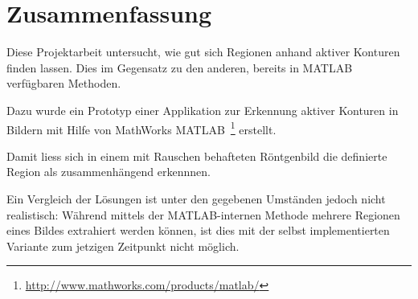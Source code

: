 \chapter{Zusammenfassung}
\label{chap:summary}

Diese Projektarbeit untersucht, wie gut sich Regionen anhand aktiver Konturen finden lassen. Dies im Gegensatz zu den anderen, bereits in MATLAB verfügbaren Methoden.

Dazu wurde ein Prototyp einer Applikation zur Erkennung aktiver Konturen in Bildern mit Hilfe von MathWorks \gls{MATLAB}~\footnote{\url{http://www.mathworks.com/products/matlab/}} erstellt.

Damit liess sich in einem mit Rauschen behafteten Röntgenbild die definierte Region als zusammenhängend erkennnen.

Ein Vergleich der Lösungen ist unter den gegebenen Umständen jedoch nicht realistisch: Während mittels der MATLAB-internen Methode mehrere Regionen eines Bildes extrahiert werden können, ist dies mit der selbst implementierten Variante zum jetzigen Zeitpunkt nicht möglich.
